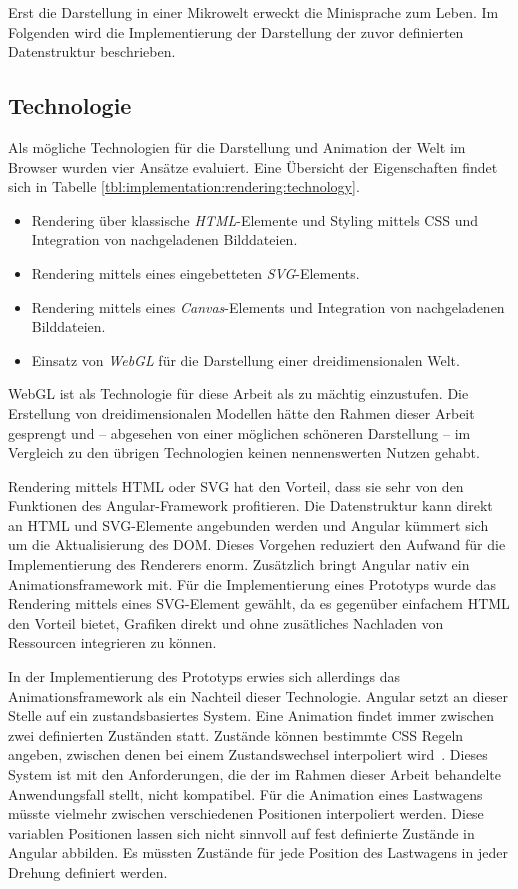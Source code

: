 Erst die Darstellung in einer Mikrowelt erweckt die Minisprache zum Leben. Im Folgenden wird die Implementierung der Darstellung der zuvor definierten Datenstruktur beschrieben.

\subsection{Technologie}
\label{sec:implementation:rendering:technology}

Als mögliche Technologien für die Darstellung und Animation der Welt im Browser wurden vier Ansätze evaluiert. Eine Übersicht der Eigenschaften findet sich in Tabelle \ref{tbl:implementation:rendering:technology}.

\begin{itemize}[noitemsep]
  \item Rendering über klassische \emph{HTML}-Elemente und Styling mittels CSS und Integration von nachgeladenen Bilddateien.
  \item Rendering mittels eines eingebetteten \emph{SVG}-Elements.
  \item Rendering mittels eines \emph{Canvas}-Elements und Integration von nachgeladenen Bilddateien.
  \item Einsatz von \emph{WebGL} für die Darstellung einer dreidimensionalen Welt.
\end{itemize}

WebGL ist als Technologie für diese Arbeit als zu mächtig einzustufen. Die Erstellung von dreidimensionalen Modellen hätte den Rahmen dieser Arbeit gesprengt und -- abgesehen von einer möglichen schöneren Darstellung -- im Vergleich zu den übrigen Technologien keinen nennenswerten Nutzen gehabt.

Rendering mittels HTML oder SVG hat den Vorteil, dass sie sehr von den Funktionen des Angular-Frame\-work profitieren. Die Datenstruktur kann direkt an HTML und SVG-Ele\-mente angebunden werden und Angular kümmert sich um die Aktualisierung des DOM. Dieses Vorgehen reduziert den Aufwand für die Implementierung des Renderers enorm. Zusätzlich bringt Angular nativ ein Animationsframework mit. Für die Implementierung eines Prototyps wurde das Rendering mittels eines SVG-Ele\-ment gewählt, da es gegenüber einfachem HTML den Vorteil bietet, Grafiken direkt und ohne zusätliches Nachladen von Ressourcen integrieren zu können.

In der Implementierung des Prototyps erwies sich allerdings das Animationsframework als ein Nachteil dieser Technologie. Angular setzt an dieser Stelle auf ein zustandsbasiertes System. Eine Animation findet immer zwischen zwei definierten Zuständen statt. Zustände können bestimmte CSS Regeln angeben, zwischen denen bei einem Zustandswechsel interpoliert wird~\cite{angular-animations}. Dieses System ist mit den Anforderungen, die der im Rahmen dieser Arbeit behandelte Anwendungsfall stellt, nicht kompatibel. Für die Animation eines Lastwagens müsste vielmehr zwischen verschiedenen Positionen interpoliert werden. Diese variablen Positionen lassen sich nicht sinnvoll auf fest definierte Zustände in Angular abbilden. Es müssten Zustände für jede Position des Lastwagens in jeder Drehung definiert werden.

